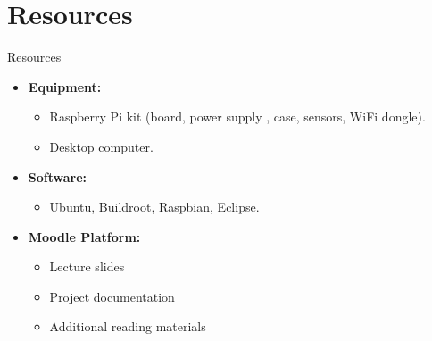 \section{Resources}
\begin{frame}{Resources}
  \begin{itemize}
    \item \textbf{Equipment:}
    \begin{itemize}
      \item Raspberry Pi kit (board, power supply , case, sensors, WiFi dongle).
      \item Desktop computer.
    \end{itemize}
    \item \textbf{Software:}
    \begin{itemize}
      \item Ubuntu, Buildroot, Raspbian, Eclipse.
    \end{itemize}
    \item \textbf{Moodle Platform:}
    \begin{itemize}
      \item Lecture slides
      \item Project documentation
      \item Additional reading materials
    \end{itemize}
  \end{itemize}
\end{frame}

